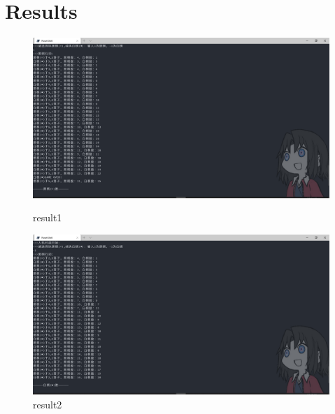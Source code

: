 ﻿\documentclass[a4paper, 11pt]{article}
\begin{document}
\section{Results}
\begin{figure}[ht]
	\centering
	\includegraphics[width=15cm]{result1.png}
	\caption{result1}
	\includegraphics[width=15cm]{result2.png}
	\caption{result2}
\end{figure}


%
%
\end{document}

